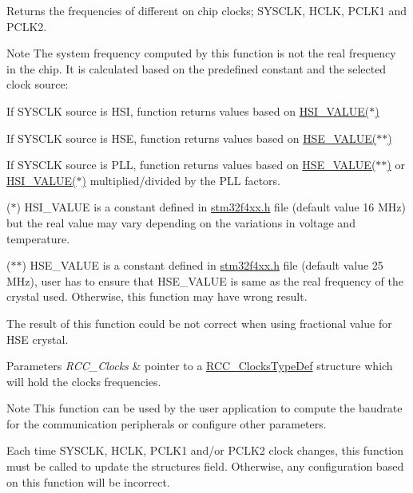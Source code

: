 Returns the frequencies of different on chip clocks; S\+Y\+S\+C\+LK, H\+C\+LK, P\+C\+L\+K1 and P\+C\+L\+K2. 

\begin{DoxyNote}{Note}
The system frequency computed by this function is not the real frequency in the chip. It is calculated based on the predefined constant and the selected clock source\+: 

If S\+Y\+S\+C\+LK source is H\+SI, function returns values based on \hyperlink{group___library__configuration__section_gaaa8c76e274d0f6dd2cefb5d0b17fbc37}{H\+S\+I\+\_\+\+V\+A\+L\+U\+E($\ast$)} 

If S\+Y\+S\+C\+LK source is H\+SE, function returns values based on \hyperlink{group___library__configuration__section_gaeafcff4f57440c60e64812dddd13e7cb}{H\+S\+E\+\_\+\+V\+A\+L\+U\+E($\ast$$\ast$)} 

If S\+Y\+S\+C\+LK source is P\+LL, function returns values based on \hyperlink{group___library__configuration__section_gaeafcff4f57440c60e64812dddd13e7cb}{H\+S\+E\+\_\+\+V\+A\+L\+U\+E($\ast$$\ast$)} or \hyperlink{group___library__configuration__section_gaaa8c76e274d0f6dd2cefb5d0b17fbc37}{H\+S\+I\+\_\+\+V\+A\+L\+U\+E($\ast$)} multiplied/divided by the P\+LL factors. 

($\ast$) H\+S\+I\+\_\+\+V\+A\+L\+UE is a constant defined in \hyperlink{stm32f4xx_8h}{stm32f4xx.\+h} file (default value 16 M\+Hz) but the real value may vary depending on the variations in voltage and temperature. 

($\ast$$\ast$) H\+S\+E\+\_\+\+V\+A\+L\+UE is a constant defined in \hyperlink{stm32f4xx_8h}{stm32f4xx.\+h} file (default value 25 M\+Hz), user has to ensure that H\+S\+E\+\_\+\+V\+A\+L\+UE is same as the real frequency of the crystal used. Otherwise, this function may have wrong result.

The result of this function could be not correct when using fractional value for H\+SE crystal.
\end{DoxyNote}

\begin{DoxyParams}{Parameters}
{\em R\+C\+C\+\_\+\+Clocks} & pointer to a \hyperlink{struct_r_c_c___clocks_type_def}{R\+C\+C\+\_\+\+Clocks\+Type\+Def} structure which will hold the clocks frequencies.\\
\hline
\end{DoxyParams}
\begin{DoxyNote}{Note}
This function can be used by the user application to compute the baudrate for the communication peripherals or configure other parameters. 

Each time S\+Y\+S\+C\+LK, H\+C\+LK, P\+C\+L\+K1 and/or P\+C\+L\+K2 clock changes, this function must be called to update the structure\textquotesingle{}s field. Otherwise, any configuration based on this function will be incorrect.
\end{DoxyNote}

